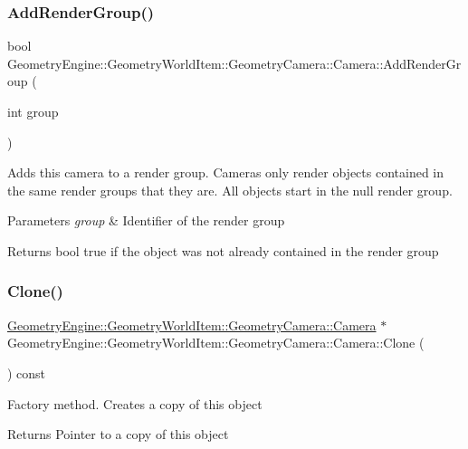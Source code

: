 \subsubsection{\texorpdfstring{AddRenderGroup()}{AddRenderGroup()}}
{\footnotesize\ttfamily bool Geometry\+Engine\+::\+Geometry\+World\+Item\+::\+Geometry\+Camera\+::\+Camera\+::\+Add\+Render\+Group (\begin{DoxyParamCaption}\item[{int}]{group }\end{DoxyParamCaption})\hspace{0.3cm}{\ttfamily [virtual]}}

Adds this camera to a render group. Cameras only render objects contained in the same render groups that they are. All objects start in the null render group. 
\begin{DoxyParams}{Parameters}
{\em group} & Identifier of the render group \\
\hline
\end{DoxyParams}
\begin{DoxyReturn}{Returns}
bool true if the object was not already contained in the render group 
\end{DoxyReturn}
\mbox{\label{class_geometry_engine_1_1_geometry_world_item_1_1_geometry_camera_1_1_camera_a53b37943c1929fde7396c66a36fb3c52}} 
\subsubsection{\texorpdfstring{Clone()}{Clone()}}
{\footnotesize\ttfamily \mbox{\hyperlink{class_geometry_engine_1_1_geometry_world_item_1_1_geometry_camera_1_1_camera}{Geometry\+Engine\+::\+Geometry\+World\+Item\+::\+Geometry\+Camera\+::\+Camera}} $\ast$ Geometry\+Engine\+::\+Geometry\+World\+Item\+::\+Geometry\+Camera\+::\+Camera\+::\+Clone (\begin{DoxyParamCaption}{ }\end{DoxyParamCaption}) const\hspace{0.3cm}{\ttfamily [virtual]}}

Factory method. Creates a copy of this object \begin{DoxyReturn}{Returns}
Pointer to a copy of this object 
\end{DoxyReturn}


